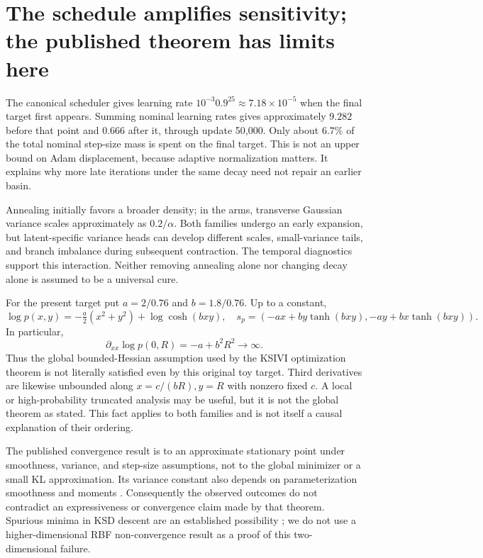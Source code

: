 \documentclass[11pt,a4paper]{article}
\numberwithin{equation}{section}
\begin{document}
\section{The schedule amplifies sensitivity; the published theorem has limits here}
The canonical scheduler gives learning rate $10^{-3}0.9^{25}\approx
7.18\times10^{-5}$ when the final target first appears. Summing nominal
learning rates gives approximately $9.282$ before that point and $0.666$
after it, through update 50,000. Only about $6.7\%$ of the total nominal
step-size mass is spent on the final target. This is not an upper bound on
Adam displacement, because adaptive normalization matters. It explains why
more late iterations under the same decay need not repair an earlier basin.

Annealing initially favors a broader density; in the arms, transverse Gaussian
variance scales approximately as $0.2/\alpha$. Both families undergo an early
expansion, but latent-specific variance heads can develop different scales,
small-variance tails, and branch imbalance during subsequent contraction.
The temporal diagnostics support this interaction. Neither removing
annealing alone nor changing decay alone is assumed to be a universal cure.

For the present target put $a=2/0.76$ and $b=1.8/0.76$. Up to a constant,
\[
 \log p(x,y)=-\tfrac a2(x^2+y^2)+\log\cosh(bxy),
 \quad s_p=(-ax+by\tanh(bxy),-ay+bx\tanh(bxy)).
\]
In particular,
\[
 \partial_{xx}\log p(0,R)=-a+b^2R^2\longrightarrow\infty.
\]
Thus the global bounded-Hessian assumption used by the KSIVI optimization
theorem is not literally satisfied even by this original toy target. Third
derivatives are likewise unbounded along $x=c/(bR),y=R$ with nonzero fixed
$c$. A local or high-probability truncated analysis may be useful, but it is
not the global theorem as stated. This fact applies to both families and is
not itself a causal explanation of their ordering.

The published convergence result is to an approximate stationary point under
smoothness, variance, and step-size assumptions, not to the global minimizer
or a small KL approximation. Its variance constant also depends on
parameterization smoothness and moments \cite{cheng,yu}. Consequently the
observed outcomes do not contradict an expressiveness or convergence claim
made by that theorem. Spurious minima in KSD descent are an established
possibility \cite{korba}; we do not use a higher-dimensional RBF
non-convergence result as a proof of this two-dimensional failure.
\end{document}
